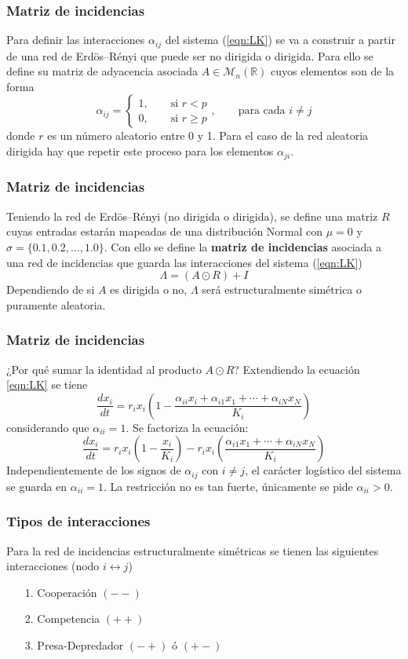 \documentclass[10pt]{beamer}
\begin{document}
\begin{frame}
  \frametitle{Matriz de incidencias}
  Para definir las interacciones $\alpha_{ij}$ del sistema (\ref{eqn:LK}) se va a construir a partir de una red de Erdös–Rényi que puede ser no dirigida o dirigida.
  \newline
  \newline
  Para ello se define su matriz de adyacencia asociada $A\in\mathcal{M}_n(\mathbb{R})$ cuyos elementos son de la forma
  $$\alpha_{ij}=\begin{cases}
  	1,\qquad\text{si }r<p\\
  	0,\qquad\text{si }r\geq p
  \end{cases},\qquad\text{para cada }i\neq j$$  
  donde $r$ es un número aleatorio entre 0 y 1. Para el caso de la red aleatoria dirigida hay que repetir este proceso para los elementos $\alpha_{ji}$.
\end{frame}
\begin{frame}
  \frametitle{Matriz de incidencias}
  Teniendo la red de Erdös–Rényi (no dirigida o dirigida), se define una matriz $R$ cuyas entradas estarán mapeadas de una distribución Normal con $\mu=0$ y $\sigma=\{0.1,0.2,...,1.0\}$.
  \newline
  \newline
  Con ello se define la \textbf{matriz de incidencias} asociada a una red de incidencias que guarda las interacciones del sistema (\ref{eqn:LK})
  $$\Lambda=(A\odot R)+I$$
  Dependiendo de si $A$ es dirigida o no, $\Lambda$ será estructuralmente simétrica o puramente aleatoria.
\end{frame}
\begin{frame}
  \frametitle{Matriz de incidencias}
  ¿Por qué sumar la identidad al producto $A\odot R$? Extendiendo la ecuación \ref{eqn:LK} se tiene
  $$\frac{dx_i}{dt}=r_ix_i\left (1-\frac{\alpha_{ii}x_i+\alpha_{i1}x_1+\cdots+\alpha_{iN}x_N}{K_i}\right )$$
  considerando que $\alpha_{ii}=1$. Se factoriza la ecuación:
  $$\frac{dx_i}{dt}=r_ix_i\left (1-\frac{x_i}{K_i}\right )-r_ix_i\left (\frac{\alpha_{i1}x_1+\cdots+\alpha_{iN}x_N}{K_i}\right )$$
  Independientemente de los signos de $\alpha_{ij}$ con $i\neq j$, el carácter logístico del sistema se guarda en $\alpha_{ii}=1$. La restricción no es tan fuerte, únicamente se pide $\alpha_{ii}>0$.
\end{frame}
\begin{frame}
  \frametitle{Tipos de interacciones}
  Para la red de incidencias estructuralmente simétricas se tienen las siguientes interacciones (nodo $i\leftrightarrow j$)
  \newline
  \begin{itemize}
  	\item[1.] Cooperación $(--)$
  	\item[2.] Competencia $(++)$
  	\item[3.] Presa-Depredador $(-+)$ ó $(+-)$
  \end{itemize}
\end{frame}
\end{document}
